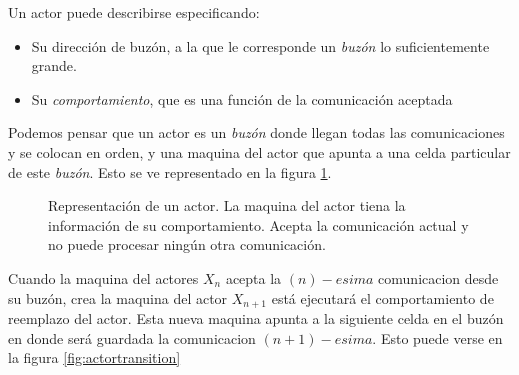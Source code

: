 Un actor puede describirse especificando:

\begin{itemize}
 \item Su dirección de buzón, a la que le corresponde un \textit{buzón} lo suficientemente grande.
 \item Su \textit{comportamiento}, que es una función de la comunicación aceptada
\end{itemize}

Podemos pensar que un actor es un \textit{buzón} donde llegan todas las comunicaciones y se colocan en orden, y una maquina del actor que apunta a una celda particular de este \textit{buzón}. Esto se ve representado en la figura \ref{fig:mailqueue}.

\begin{figure}[H]
\caption{Representación de un actor. La maquina del actor tiena la información de su comportamiento. Acepta la comunicación actual y no puede procesar ningún otra comunicación.}
\label{fig:mailqueue}
\end{figure}

Cuando la maquina del actores $X_n$ acepta la $(n)-esima$ comunicacion desde su buzón, crea la maquina del actor $X_{n+1}$ está ejecutará el comportamiento de reemplazo del actor. Esta nueva maquina apunta a la siguiente celda en el buzón en donde será guardada la comunicacion $(n+1)-esima$. Esto puede verse en la figura \ref{fig:actortransition}

